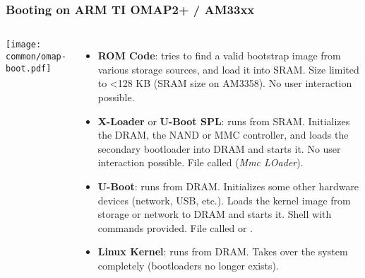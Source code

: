 \begin{frame}
\frametitle{Booting on ARM TI OMAP2+ / AM33xx}
  \begin{columns}
    \texttt{[image: common/omap-boot.pdf]}
    \footnotesize
    \begin{itemize}
    \item {\bf ROM Code}: tries to find a valid bootstrap image from
      various storage sources, and load it into SRAM. Size
      limited to \textless 128 KB (SRAM size on AM3358).
      No user interaction possible.
    \item {\bf X-Loader} or {\bf U-Boot SPL}: runs from SRAM. Initializes
      the DRAM, the NAND or MMC controller, and loads the secondary
      bootloader into DRAM and starts it. No user interaction
      possible. File called  ({\em Mmc LOader}).
    \item {\bf U-Boot}: runs from DRAM. Initializes some other hardware
      devices (network, USB, etc.).  Loads the kernel image from
      storage or network to DRAM and starts it. Shell with commands
      provided. File called  or .
    \item {\bf Linux Kernel}: runs from DRAM. Takes over the system
      completely (bootloaders no longer exists).
    \end{itemize}
  \end{columns}
\end{frame}

